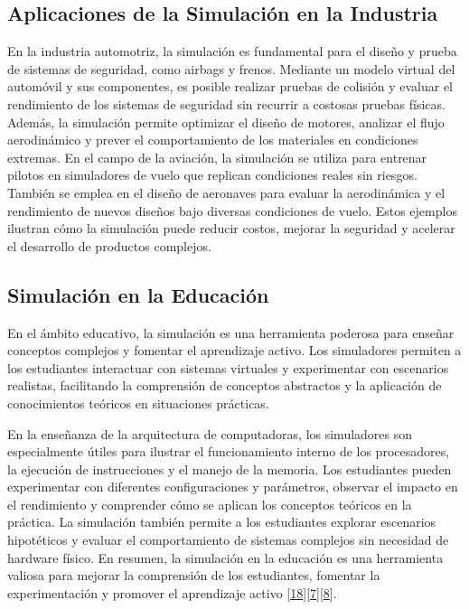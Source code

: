 \documentclass[12pt,twoside]{templates/unerthesis}
\begin{document}
\hypertarget{aplicaciones-de-la-simulaciuxf3n-en-la-industria}{%
\subsection{Aplicaciones de la Simulación en la Industria}\label{aplicaciones-de-la-simulaciuxf3n-en-la-industria}}

En la industria automotriz, la simulación es fundamental para el diseño y prueba de sistemas de seguridad, como airbags y frenos. Mediante un modelo virtual del automóvil y sus componentes, es posible realizar pruebas de colisión y evaluar el rendimiento de los sistemas de seguridad sin recurrir a costosas pruebas físicas. Además, la simulación permite optimizar el diseño de motores, analizar el flujo aerodinámico y prever el comportamiento de los materiales en condiciones extremas. En el campo de la aviación, la simulación se utiliza para entrenar pilotos en simuladores de vuelo que replican condiciones reales sin riesgos. También se emplea en el diseño de aeronaves para evaluar la aerodinámica y el rendimiento de nuevos diseños bajo diversas condiciones de vuelo. Estos ejemplos ilustran cómo la simulación puede reducir costos, mejorar la seguridad y acelerar el desarrollo de productos complejos.

\hypertarget{simulaciuxf3n-en-la-educaciuxf3n}{%
\subsection{Simulación en la Educación}\label{simulaciuxf3n-en-la-educaciuxf3n}}

En el ámbito educativo, la simulación es una herramienta poderosa para enseñar conceptos complejos y fomentar el aprendizaje activo. Los simuladores permiten a los estudiantes interactuar con sistemas virtuales y experimentar con escenarios realistas, facilitando la comprensión de conceptos abstractos y la aplicación de conocimientos teóricos en situaciones prácticas.

En la enseñanza de la arquitectura de computadoras, los simuladores son especialmente útiles para ilustrar el funcionamiento interno de los procesadores, la ejecución de instrucciones y el manejo de la memoria. Los estudiantes pueden experimentar con diferentes configuraciones y parámetros, observar el impacto en el rendimiento y comprender cómo se aplican los conceptos teóricos en la práctica. La simulación también permite a los estudiantes explorar escenarios hipotéticos y evaluar el comportamiento de sistemas complejos sin necesidad de hardware físico. En resumen, la simulación en la educación es una herramienta valiosa para mejorar la comprensión de los estudiantes, fomentar la experimentación y promover el aprendizaje activo {[}\protect\hyperlink{ref-skrien_cpu_2001}{18}{]}{[}\protect\hyperlink{ref-garcia-garcia_pbbcache_2020}{7}{]}{[}\protect\hyperlink{ref-nova_tool_2013}{8}{]}.
\end{document}
